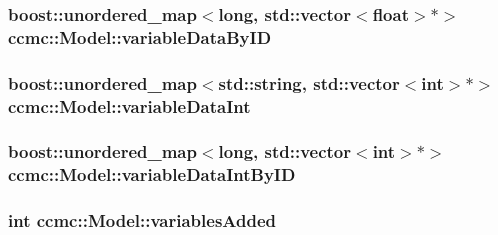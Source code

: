 \hypertarget{classccmc_1_1_model_ad73147779c03081227de041ffe4542a8}{
\subsubsection[{variable\-Data\-By\-I\-D}]{\setlength{\rightskip}{0pt plus 5cm}boost\-::unordered\-\_\-map$<$long, std\-::vector$<$float$>$$\ast$$>$ ccmc\-::\-Model\-::variable\-Data\-By\-I\-D\hspace{0.3cm}{\ttfamily [protected]}}}\label{classccmc_1_1_model_ad73147779c03081227de041ffe4542a8}
\hypertarget{classccmc_1_1_model_a7dd720b592092ee2e1f24c162b712606}{
\subsubsection[{variable\-Data\-Int}]{\setlength{\rightskip}{0pt plus 5cm}boost\-::unordered\-\_\-map$<$std\-::string, std\-::vector$<$int$>$$\ast$$>$ ccmc\-::\-Model\-::variable\-Data\-Int\hspace{0.3cm}{\ttfamily [protected]}}}\label{classccmc_1_1_model_a7dd720b592092ee2e1f24c162b712606}
\hypertarget{classccmc_1_1_model_a699883059cbb36f977a724c7855b0d76}{
\subsubsection[{variable\-Data\-Int\-By\-I\-D}]{\setlength{\rightskip}{0pt plus 5cm}boost\-::unordered\-\_\-map$<$long, std\-::vector$<$int$>$$\ast$$>$ ccmc\-::\-Model\-::variable\-Data\-Int\-By\-I\-D\hspace{0.3cm}{\ttfamily [protected]}}}\label{classccmc_1_1_model_a699883059cbb36f977a724c7855b0d76}
\hypertarget{classccmc_1_1_model_aa56cc5aabd75f24aba74103bb3970abb}{
\subsubsection[{variables\-Added}]{\setlength{\rightskip}{0pt plus 5cm}int ccmc\-::\-Model\-::variables\-Added\hspace{0.3cm}{\ttfamily [protected]}}}\label{classccmc_1_1_model_aa56cc5aabd75f24aba74103bb3970abb}
